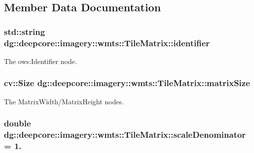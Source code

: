 \subsection{Member Data Documentation}
\subsubsection[{\texorpdfstring{identifier}{identifier}}]{\setlength{\rightskip}{0pt plus 5cm}std\+::string dg\+::deepcore\+::imagery\+::wmts\+::\+Tile\+Matrix\+::identifier}\hypertarget{structdg_1_1deepcore_1_1imagery_1_1wmts_1_1_tile_matrix_a86b15e6a28c6ade6c2059d6c52473eaa}{}\label{structdg_1_1deepcore_1_1imagery_1_1wmts_1_1_tile_matrix_a86b15e6a28c6ade6c2059d6c52473eaa}


The ows\+:Identifier node. 

\subsubsection[{\texorpdfstring{matrix\+Size}{matrixSize}}]{\setlength{\rightskip}{0pt plus 5cm}cv\+::\+Size dg\+::deepcore\+::imagery\+::wmts\+::\+Tile\+Matrix\+::matrix\+Size}\hypertarget{structdg_1_1deepcore_1_1imagery_1_1wmts_1_1_tile_matrix_a2a8b014ac1759efe664e5f6b609182e4}{}\label{structdg_1_1deepcore_1_1imagery_1_1wmts_1_1_tile_matrix_a2a8b014ac1759efe664e5f6b609182e4}


The Matrix\+Width/\+Matrix\+Height nodes. 

\subsubsection[{\texorpdfstring{scale\+Denominator}{scaleDenominator}}]{\setlength{\rightskip}{0pt plus 5cm}double dg\+::deepcore\+::imagery\+::wmts\+::\+Tile\+Matrix\+::scale\+Denominator = 1.}\hypertarget{structdg_1_1deepcore_1_1imagery_1_1wmts_1_1_tile_matrix_a111edc4eea402d1a9e40f60f0d673ece}{}\label{structdg_1_1deepcore_1_1imagery_1_1wmts_1_1_tile_matrix_a111edc4eea402d1a9e40f60f0d673ece}


